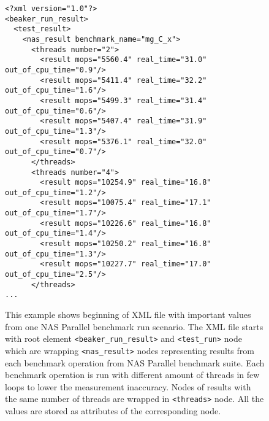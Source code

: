 \begin{figure}
  \small
  \begin{verbatim}
<?xml version="1.0"?>
<beaker_run_result>
  <test_result>
    <nas_result benchmark_name="mg_C_x">
      <threads number="2">
        <result mops="5560.4" real_time="31.0" out_of_cpu_time="0.9"/>
        <result mops="5411.4" real_time="32.2" out_of_cpu_time="1.6"/>
        <result mops="5499.3" real_time="31.4" out_of_cpu_time="0.6"/>
        <result mops="5407.4" real_time="31.9" out_of_cpu_time="1.3"/>
        <result mops="5376.1" real_time="32.0" out_of_cpu_time="0.7"/>
      </threads>
      <threads number="4">
        <result mops="10254.9" real_time="16.8" out_of_cpu_time="1.2"/>
        <result mops="10075.4" real_time="17.1" out_of_cpu_time="1.7"/>
        <result mops="10226.6" real_time="16.8" out_of_cpu_time="1.4"/>
        <result mops="10250.2" real_time="16.8" out_of_cpu_time="1.3"/>
        <result mops="10227.7" real_time="17.0" out_of_cpu_time="2.5"/>
      </threads>
...
\end{verbatim}
  \normalsize
  \caption{This example shows beginning of XML file with important values from one NAS
    Parallel benchmark run scenario. The XML file starts with root element
    \texttt{<beaker\_run\_result>} and \texttt{<test\_run>} node which are wrapping
    \texttt{<nas\_result>} nodes representing results from each benchmark operation
    from NAS Parallel benchmark suite. Each benchmark operation is run with
    different amount of threads in few loops to lower the measurement inaccuracy.
    Nodes of results with the same number of threads are wrapped in
    \texttt{<threads>} node. All the values are stored as attributes of the
    corresponding node.}
  \label{fig:xml_result}
\end{figure}

